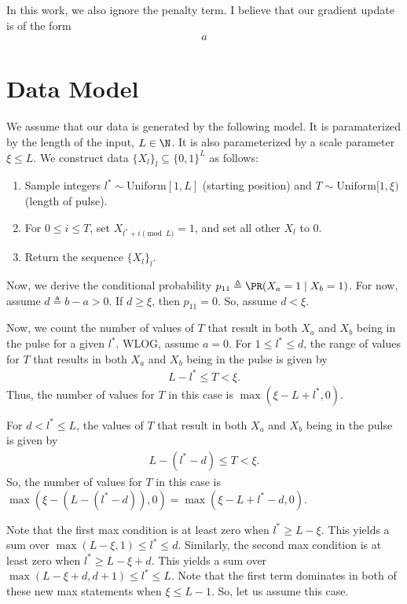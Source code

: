 \documentclass{article}
\begin{document}
In this work, we also ignore the penalty term.
I believe that our gradient update is of the form
\begin{align}
  a
\end{align}


\section{Data Model}
We assume that our data is generated by the following model.
It is paramaterized by the length of the input, $L \in \N$.
It is also parameterized by a scale parameter $\xi \leq L$.
We construct data $\{ X_l \}_l \subseteq \{ 0,1 \}^L$ as follows:
\begin{enumerate}
  \item Sample integers $l^* \sim \text{Uniform}[1, L]$ (starting position) and $T \sim \text{Uniform}[1, \xi)$ (length of pulse).
  \item For $0 \leq i \leq T$, set $X_{l^* + i \pmod{L}} = 1$, and set all other $X_l$ to $0$.
  \item Return the sequence $\{ X_l \}_l$.
\end{enumerate}
Now, we derive the conditional probability $p_{11} \triangleq \PR( X_a = 1 \mid X_b = 1 )$.
For now, assume $d \triangleq b - a > 0$.
If $d \geq \xi$, then $p_{11} = 0$.
So, assume $d < \xi$.

Now, we count the number of values of $T$ that result in both $X_a$ and $X_b$ being in the pulse for a given $l^*$.
WLOG, assume $a = 0$.
For $1 \leq l^* \leq d$, the range of values for $T$ that results in both $X_a$ and $X_b$ being in the pulse is given by
\begin{align}
  L - l^* \leq T < \xi. \label{eq:case1_Trange}
\end{align}
Thus, the number of values for $T$ in this case is $\max( \xi - L + l^* , 0 )$.

For $d < l^* \leq L$, the values of $T$ that result in both $X_a$ and $X_b$ being in the pulse is given by
\begin{align}
  L - (l^* - d) \leq T < \xi. \label{eq:case2_Trange}
\end{align}
So, the number of values for $T$ in this case is $\max(\xi - (L - (l^* - d)), 0) = \max(\xi - L + l^* - d, 0)$.

Note that the first max condition is at least zero when $l^* \geq L - \xi$.
This yields a sum over $\max(L - \xi, 1) \leq l^* \leq d$.
Similarly, the second max condition is at least zero when $l^* \geq L - \xi + d$.
This yields a sum over $\max( L - \xi + d, d+1) \leq l^* \leq L$.
Note that the first term dominates in both of these new max statements when $\xi \leq L-1$.
So, let us assume this case.
\end{document}
